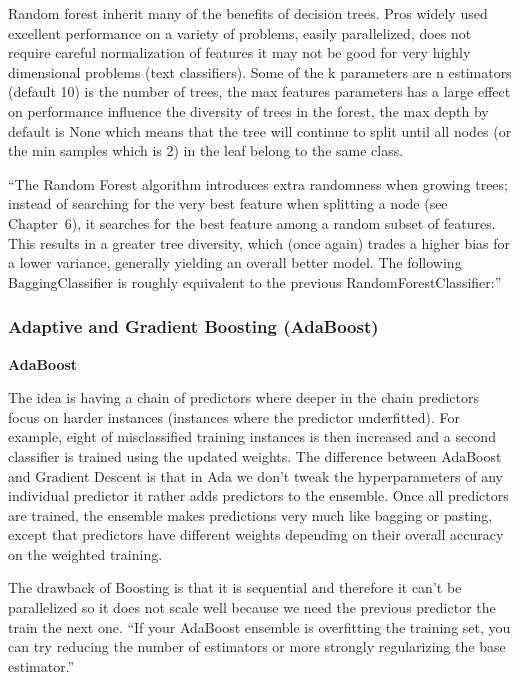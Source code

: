 \documentclass[11pt]{article}
\begin{document}
Random forest inherit many of the benefits of decision trees. Pros widely used excellent performance on a variety of problems, easily parallelized, does not require careful normalization of features it may not be good for very highly dimensional problems (text classifiers). Some of the k parameters are n estimators (default 10) is the number of trees, the max features parameters has a large effect on performance influence the diversity of trees in the forest, the max depth by default is None which means that the tree will continue to split until all nodes (or the min samples which is 2) in the leaf belong to the same class.

“The Random Forest algorithm introduces extra randomness when growing trees; instead of searching for the very best feature when splitting a node (see Chapter 6), it searches for the best feature among a random subset of features. This results in a greater tree diversity, which (once again) trades a higher bias for a lower variance, generally yielding an overall better model. The following BaggingClassifier is roughly equivalent to the previous RandomForestClassifier:”


\subsubsection{Adaptive and Gradient Boosting (AdaBoost)}
\textbf{AdaBoost}

The idea is having a chain of predictors where deeper in the chain predictors focus on harder instances (instances where the predictor underfitted). For example, eight of misclassified training instances is then increased and a second classifier is trained using the updated weights. The difference between AdaBoost and Gradient Descent is that in Ada we don't tweak the hyperparameters of any individual predictor it rather adds predictors to the ensemble. Once all predictors are trained, the ensemble makes predictions very much like bagging or pasting, except that predictors have different weights depending on their overall accuracy on the weighted training.

The drawback of Boosting is that it is sequential and therefore it can't be parallelized so it does not scale well because we need the previous predictor the train the next one.
“If your AdaBoost ensemble is overfitting the training set, you can try reducing the number of estimators or more strongly regularizing the base estimator.”
\end{document}

